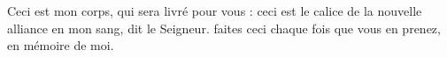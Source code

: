 Ceci est mon corps,
qui sera livré pour vous :
ceci est le calice de la nouvelle alliance en mon sang,
dit le Seigneur.
faites ceci
chaque fois que vous en prenez,
en mémoire de moi.